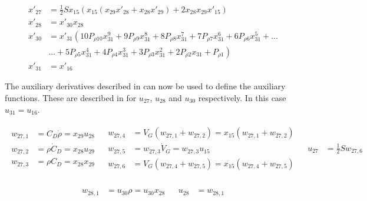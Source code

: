  \begin{equation} \label{eq:dragDerAux}
\begin{split}
x'_{27} &= \frac{1}{2}Sx_{15}\left(x_{15} \left(x_{29}x'_{28}+x_{28}x'_{29}\right)+2x_{28}x_{29}x'_{15}\right) \\
x'_{28} &= x'_{30}x_{28} \\
x'_{30} &=x'_{31} \left(10 P_{\rho 10}x_{31}^{9}+9 P_{\rho 9}x_{31}^{8}+8 P_{\rho 8}x_{31}^{7}+7 P_{\rho 7}x_{31}^{6}+6 P_{\rho 6}x_{31}^{5}+\dots \right. \\
&  \left. \dotsc +5 P_{\rho 5}x_{31}^{4}+4 P_{\rho 4}x_{31}^{3}+3 P_{\rho 3}x_{31}^{2}+2 P_{\rho 2}x_{31}+P_{\rho 1}\right) \\
x'_{31} &= x'_{16}
\end{split}
\end{equation}

The auxiliary derivatives described in  can now be used to define the auxiliary functions. These are described in  for $u_{27}$, $u_{28}$ and $u_{30}$ respectively. In this case $u_{31}=u_{16}$.

\begin{align} \label{eq:u27}
\begin{split}
w_{27,1} &= C_{D}\dot{\rho} = x_{29}u_{28} \\
w_{27,2} &= \rho \dot{C}_{D} = x_{28}u_{29} \\
w_{27,3} &= \rho C_{D} = x_{28}x_{29} \\
\end{split}
&
\begin{split}
w_{27,4} &= V_{G}\left(w_{27,1}+w_{27,2}\right) = x_{15}\left(w_{27,1}+w_{27,2}\right) \\
w_{27,5} &= w_{27,3}\dot{V}_{G} = w_{27,3}u_{15} \\
w_{27,6} &= V_{G}\left(w_{27,4}+w_{27,5}\right) = x_{15}\left(w_{27,4}+w_{27,5}\right) \\
\end{split}
&
\begin{split}
u_{27} &= \frac{1}{2} S w_{27,6}\\
\end{split}
\end{align}

\begin{align} \label{eq:u28}
\begin{split}
w_{28,1} &= u_{30}\rho = u_{30}x_{28} \\
\end{split}
&
\begin{split}
u_{28} &= w_{28,1} \\
\end{split}
\end{align}

